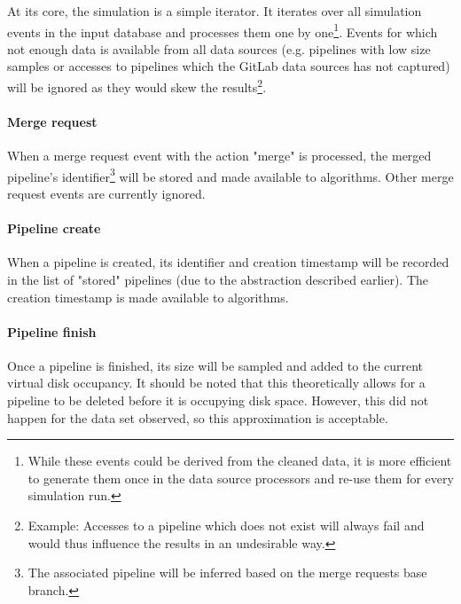     At its core, the simulation is a simple iterator. It iterates over all simulation events in the input database and processes them one by one\footnote{While these events could be derived from the cleaned data, it is more efficient to generate them once in the data source processors and re-use them for every simulation run.}. Events for which not enough data is available from all data sources (e.g. pipelines with low size samples or accesses to pipelines which the GitLab data sources has not captured) will be ignored as they would skew the results\footnote{Example: Accesses to a pipeline which does not exist will always fail and would thus influence the results in an undesirable way.}.
    
    \paragraph{Merge request} When a merge request event with the action "merge" is processed, the merged pipeline's identifier\footnote{The associated pipeline will be inferred based on the merge requests base branch.} will be stored and made available to algorithms. Other merge request events are currently ignored.
    
    \paragraph{Pipeline create} When a pipeline is created, its identifier and creation timestamp will be recorded in the list of "stored" pipelines (due to the abstraction described earlier). The creation timestamp is made available to algorithms.
    
    \paragraph{Pipeline finish} Once a pipeline is finished, its size will be sampled and added to the current virtual disk occupancy. It should be noted that this theoretically allows for a pipeline to be deleted before it is occupying disk space. However, this did not happen for the data set observed, so this approximation is acceptable.
    
